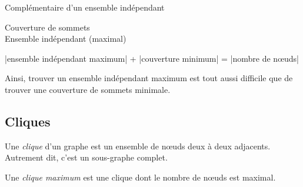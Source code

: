 \begin{myexem} \label{cm7:ex1}
	Complémentaire d'un ensemble indépendant
	\begin{figure} [!h]
	\end{figure} \newline
	\color{green}Couverture de sommets \\
	\color{red}Ensemble indépendant (maximal)
	\color{black}
\end{myexem}


\begin{mycorr} 
|ensemble indépendant maximum| + |couverture minimum| = |nombre de nœuds|
\end{mycorr}

Ainsi, trouver un ensemble indépendant maximum est tout aussi difficile que de trouver une couverture de sommets minimale.

\subsection{Cliques}

\begin{mydef}
Une \emph{clique} d'un graphe est un ensemble de nœuds deux à deux adjacents. Autrement dit, c'est un sous-graphe complet.
\end{mydef}

\begin{mydef}
Une \emph{clique maximum} est une clique dont le nombre de nœuds est maximal.
\end{mydef}

